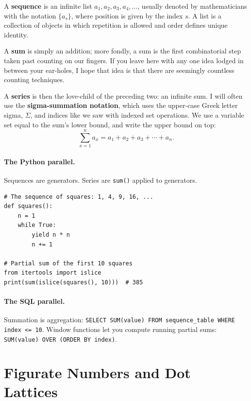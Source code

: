 A \textbf{sequence} is an infinite list $a_1, a_2, a_3, a_4, \ldots$,
usually denoted by mathematicians with the notation $\{a_s\}$, where position
is given by the index $s$. A list is a collection of objects in which
repetition is allowed and order defines unique identity.

A \textbf{sum} is simply an addition; more fondly, a sum is the first
combinatorial step taken past counting on our fingers. If you leave here with
any one idea lodged in between your ear-holes, I hope that idea is that there
are seemingly countless counting techniques.

A \textbf{series} is then the love-child of the preceding two: an infinite sum.
I will often use the \textbf{sigma-summation notation}, which uses the
upper-case Greek letter sigma, $\Sigma$, and indices like we saw with indexed
set operations. We use a variable set equal to the sum's lower bound, and
write the upper bound on top:
\[
    \sum_{x=1}^{n} a_x = a_1 + a_2 + a_3 + \cdots + a_n.
\]

\paragraph{The Python parallel.}
Sequences are generators. Series are \texttt{sum()} applied to generators.

\begin{verbatim}
# The sequence of squares: 1, 4, 9, 16, ...
def squares():
    n = 1
    while True:
        yield n * n
        n += 1

# Partial sum of the first 10 squares
from itertools import islice
print(sum(islice(squares(), 10)))  # 385
\end{verbatim}

\paragraph{The SQL parallel.}
Summation is aggregation: \texttt{SELECT SUM(value) FROM sequence\_table
WHERE index <= 10}. Window functions let you compute running partial sums:
\texttt{SUM(value) OVER (ORDER BY index)}.


\section{Figurate Numbers and Dot Lattices}
\label{sec:figurate}

